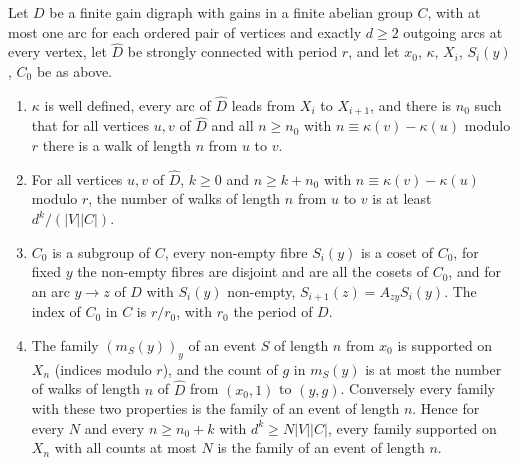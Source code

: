 \begin{lemma}\label{lem:classes}
Let $D$ be a finite gain digraph with gains in a finite abelian group $C$, with at most one arc for each ordered pair of vertices and exactly $d\ge2$ outgoing arcs at every vertex, let $\hat D$ be strongly connected with period $r$, and let $x_0$, $\kappa$, $X_i$, $S_i(y)$, $C_0$ be as above.
\begin{enumerate}
\item[(1)] $\kappa$ is well defined, every arc of $\hat D$ leads from $X_i$ to $X_{i+1}$, and there is $n_0$ such that for all vertices $u,v$ of $\hat D$ and all $n\ge n_0$ with $n\equiv\kappa(v)-\kappa(u)$ modulo $r$ there is a walk of length $n$ from $u$ to $v$.
\item[(2)] For all vertices $u,v$ of $\hat D$, $k\ge0$ and $n\ge k+n_0$ with $n\equiv\kappa(v)-\kappa(u)$ modulo $r$, the number of walks of length $n$ from $u$ to $v$ is at least $d^k/(|V||C|)$.
\item[(3)] $C_0$ is a subgroup of $C$, every non-empty fibre $S_i(y)$ is a coset of $C_0$, for fixed $y$ the non-empty fibres are disjoint and are all the cosets of $C_0$, and for an arc $y\to z$ of $D$ with $S_i(y)$ non-empty, $S_{i+1}(z)=A_{zy}S_i(y)$. The index of $C_0$ in $C$ is $r/r_0$, with $r_0$ the period of $D$.
\item[(4)] The family $(m_S(y))_y$ of an event $S$ of length $n$ from $x_0$ is supported on $X_{n}$ (indices modulo $r$), and the count of $g$ in $m_S(y)$ is at most the number of walks of length $n$ of $\hat D$ from $(x_0,1)$ to $(y,g)$. Conversely every family with these two properties is the family of an event of length $n$. Hence for every $N$ and every $n\ge n_0+k$ with $d^k\ge N|V||C|$, every family supported on $X_n$ with all counts at most $N$ is the family of an event of length $n$.
\end{enumerate}
\end{lemma}
